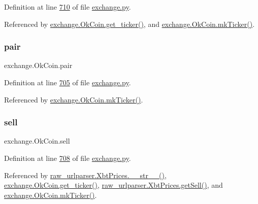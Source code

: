 Definition at line \hyperlink{exchange_8py_source_l00710}{710} of file \hyperlink{exchange_8py_source}{exchange.\+py}.



Referenced by \hyperlink{exchange_8py_source_l00716}{exchange.\+Ok\+Coin.\+get\+\_\+ticker()}, and \hyperlink{exchange_8py_source_l00730}{exchange.\+Ok\+Coin.\+mk\+Ticker()}.

\mbox{\label{classexchange_1_1_ok_coin_a52f3b919f86565518d46c49c5b8f66a6}} 
\subsubsection{\texorpdfstring{pair}{pair}}
{\footnotesize\ttfamily exchange.\+Ok\+Coin.\+pair}



Definition at line \hyperlink{exchange_8py_source_l00705}{705} of file \hyperlink{exchange_8py_source}{exchange.\+py}.



Referenced by \hyperlink{exchange_8py_source_l00730}{exchange.\+Ok\+Coin.\+mk\+Ticker()}.

\mbox{\label{classexchange_1_1_ok_coin_aadb487d2e2f277374a747e1bcb0bd40b}} 
\subsubsection{\texorpdfstring{sell}{sell}}
{\footnotesize\ttfamily exchange.\+Ok\+Coin.\+sell}



Definition at line \hyperlink{exchange_8py_source_l00708}{708} of file \hyperlink{exchange_8py_source}{exchange.\+py}.



Referenced by \hyperlink{raw__urlparser_8py_source_l00074}{raw\+\_\+urlparser.\+Xbt\+Prices.\+\_\+\+\_\+str\+\_\+\+\_\+()}, \hyperlink{exchange_8py_source_l00716}{exchange.\+Ok\+Coin.\+get\+\_\+ticker()}, \hyperlink{raw__urlparser_8py_source_l00065}{raw\+\_\+urlparser.\+Xbt\+Prices.\+get\+Sell()}, and \hyperlink{exchange_8py_source_l00730}{exchange.\+Ok\+Coin.\+mk\+Ticker()}.

